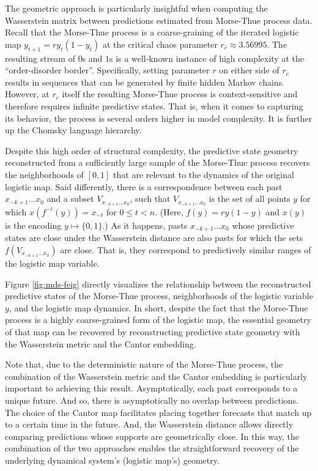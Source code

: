 \documentclass[draft,aps,pre,twocolumn,groupaddress,showkeys,nofootinbib,preprintnumbers,floatfix]{revtex4-2}
\begin{document}
The geometric approach is particularly insightful when computing the
Wasserstein matrix between predictions estimated from Morse-Thue process data.
Recall that the Morse-Thue process is a coarse-graining of the iterated
logistic map $y_{t+1} = ry_t(1-y_t)$ at the critical chaos parameter $r_c
\approx 3.56995$. The resulting stream of $0$s and $1$s is a well-known
instance of high complexity at the ``order-disorder border''. Specifically,
setting parameter $r$ on either side of $r_c$ results in sequences that
can be generated by finite hidden Markov chains. However, at $r_c$ itself the
resulting Morse-Thue process is context-sensitive and therefore requires
infinite predictive states. That is, when it comes to capturing its behavior,
the process is several orders higher in model complexity. It is further up the
Chomsky language hierarchy.

Despite this high order of structural complexity, the predictive state geometry
reconstructed from a sufficiently large sample of the Morse-Thue process
recovers the neighborhoods of $[0,1]$ that are relevant to the dynamics of the
original logistic map. Said differently, there is a correspondence between each
past $x_{-k+1}\dots x_{0}$ and a subset $V_{x_{-k+1}\dots x_{0}}$, such that
$V_{x_{-k+1}\dots x_{0}}$ is the set of all points $y$ for which $x(f^{-t}(y)) =
x_{-t}$ for $0\leq t < n$. (Here, $f(y) = ry(1-y)$ and $x(y)$ is the encoding
$y\mapsto \{0,1\}$.) As it happens, pasts $x_{-k+1}\dots x_{0}$ whose predictive
states are close under the Wasserstein distance are also pasts for which the
sets $f(V_{x_{-k+1}\dots x_{0}})$ are close. That is, they correspond to
predictively similar ranges of the logistic map variable. 

Figure \ref{fig:mds-feig} directly visualizes the relationship between the
reconstructed predictive states of the Morse-Thue process, neighborhoods of the
logistic variable $y$, and the logistic map dynamics. In short, despite the
fact that the Morse-Thue process is a highly coarse-grained form of the
logistic map, the essential geometry of that map can be recovered by
reconstructing predictive state geometry with the Wasserstein metric and the
Cantor embedding.

Note that, due to the deterministic nature of the Morse-Thue process, the
combination of the Wasserstein metric and the Cantor embedding is particularly
important to achieving this result. Asymptotically, each past corresponds to a
unique future. And so, there is asymptotically no overlap between predictions.
The choice of the Cantor map facilitates placing together forecasts that match
up to a certain time in the future. And, the Wasserstein distance allows
directly comparing predictions whose supports are geometrically close. In this
way, the combination of the two approaches enables the straightforward recovery
of the underlying dynamical system's (logistic map's) geometry.
\end{document}
